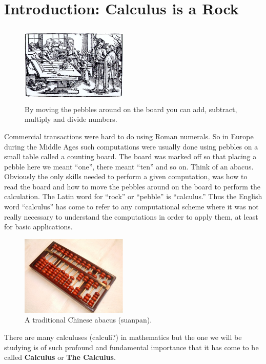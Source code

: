 \chapter*{Introduction: Calculus is a Rock}
  \label{chapt:metaphors}
\pagestyle{myheadings}

\begin{figure}
\captionsetup{labelformat=empty}
\includegraphics*[height=1.5in,width=2in]{Figures/Rechentisch}
\caption{By moving the pebbles around
  on the board you can add, subtract, multiply and divide numbers.}
\end{figure}

Commercial transactions were hard to do using Roman numerals. So in
Europe during the Middle Ages such computations were usually done
using pebbles on a small table called a counting board. The board was
marked off so that placing a pebble here we meant ``one'', there meant
``ten'' and so on. Think of an abacus. Obviously the only skills
needed to perform a given computation, was how to read the board and
how to move the pebbles around on the board to perform the
calculation.  The Latin word for ``rock'' or ``pebble'' is
``calculus.'' Thus the English word ``calculus'' has come to refer to
any computational scheme where it was not really necessary to
understand the computations in order to apply them, at least for basic
applications.

\begin{figure}
\captionsetup{labelformat=empty}
\includegraphics*[height=1.5in,width=2in]{Figures/abacus}
\caption{A traditional Chinese abacus (suanpan).}
\label{fig:abacci}
\end{figure}
  There are many calculuses (calculi?) in mathematics but the one we will be
  studying is of such profound and fundamental importance that it has
  come to be called {\bf Calculus} or {\bf The Calculus}.

